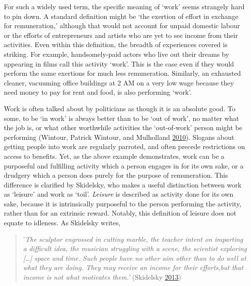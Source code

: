 \documentclass[]{tufte-handout}
\begin{document}
For such a widely used term, the specific meaning of `work' seems
strangely hard to pin down. A standard definition might be `the exertion
of effort in exchange for remuneration,' although that would not account
for unpaid domestic labour or the efforts of entrepreneurs and artists
who are yet to see income from their activities. Even within this
definition, the breadth of experiences covered is striking. For example,
handsomely-paid actors who live out their dreams by appearing in films
call this activity `work'. This is the case even if they would perform
the same exertions for much less remuneration. Similarly, an exhausted
cleaner, vacuuming office buildings at 2 AM on a very low wage because
they need money to pay for rent and food, is also performing `work'.

Work is often talked about by politicians as though it is an absolute
good. To some, to be `in work' is always better than to be `out of
work', no matter what the job is, or what other worthwhile activities
the `out-of-work' person might be performing (Wintour, Patrick Wintour,
and Mulholland \protect\hyperlink{ref-PatrickWintour2010}{2010}).
Slogans about getting people into work are regularly parroted, and often
precede restrictions on access to benefits. Yet, as the above example
demonstrates, work can be a purposeful and fulfilling activity which a
person engages in for its own sake, or a drudgery which a person does
purely for the purpose of remuneration. This difference is clarified by
Skidelsky, who makes a useful distinction between work as `leisure' and
work as `toil'. \emph{Leisure} is described as activity done for its own
sake, because it is intrinsically purposeful to the person performing
the activity, rather than for an extrinsic reward. Notably, this
definition of leisure does not equate to idleness. As Skidelsky writes,

\begin{quote}
'\emph{The sculptor engrossed in cutting marble, the teacher intent on
imparting a difficult idea, the musician struggling with a scene, the
scientist exploring {[}\ldots{}{]} space and time. Such people have no
other aim other than to do well at what they are doing. They may receive
an income for their efforts,but that income is not what motivates
them.'} (Skidelsky \protect\hyperlink{ref-Skidelsky2013}{2013})
\end{quote}
\end{document}
